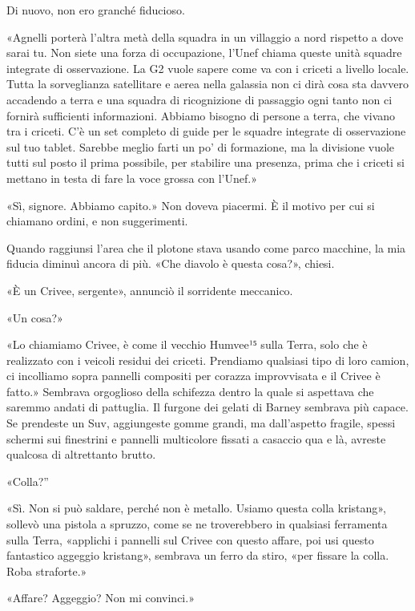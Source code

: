 Di nuovo, non ero granché fiducioso.

«Agnelli porterà l'altra metà della squadra in un villaggio a nord
rispetto a dove sarai tu. Non siete una forza di occupazione, l'Unef
chiama queste unità squadre integrate di osservazione. La G2 vuole
sapere come va con i criceti a livello locale. Tutta la sorveglianza
satellitare e aerea nella galassia non ci dirà cosa sta davvero
accadendo a terra e una squadra di ricognizione di passaggio ogni tanto
non ci fornirà sufficienti informazioni. Abbiamo bisogno di persone a
terra, che vivano tra i criceti. C'è un set completo di guide per le
squadre integrate di osservazione sul tuo tablet. Sarebbe meglio farti
un po' di formazione, ma la divisione vuole tutti sul posto il prima
possibile, per stabilire una presenza, prima che i criceti si mettano in
testa di fare la voce grossa con l'Unef.»

«Sì, signore. Abbiamo capito.» Non doveva piacermi. È il motivo per cui
si chiamano ordini, e non suggerimenti.

\hfill\break

Quando raggiunsi l'area che il plotone stava usando come parco macchine,
la mia fiducia diminuì ancora di più. «Che diavolo è questa cosa?»,
chiesi.

«È un Crivee, sergente», annunciò il sorridente meccanico.

«Un cosa?»

«Lo chiamiamo Crivee, è come il vecchio Humvee¹⁵ sulla Terra, solo che è
realizzato con i veicoli residui dei criceti. Prendiamo qualsiasi tipo
di loro camion, ci incolliamo sopra pannelli compositi per corazza
improvvisata e il Crivee è fatto.» Sembrava orgoglioso della schifezza
dentro la quale si aspettava che saremmo andati di pattuglia. Il furgone
dei gelati di Barney sembrava più capace. Se prendeste un Suv,
aggiungeste gomme grandi, ma dall'aspetto fragile, spessi schermi sui
finestrini e pannelli multicolore fissati a casaccio qua e là, avreste
qualcosa di altrettanto brutto.

«Colla?''

«Sì. Non si può saldare, perché non è metallo. Usiamo questa colla
kristang», sollevò una pistola a spruzzo, come se ne troverebbero in
qualsiasi ferramenta sulla Terra, «applichi i pannelli sul Crivee con
questo affare, poi usi questo fantastico aggeggio kristang», sembrava un
ferro da stiro, «per fissare la colla. Roba straforte.»

«Affare? Aggeggio? Non mi convinci.»

